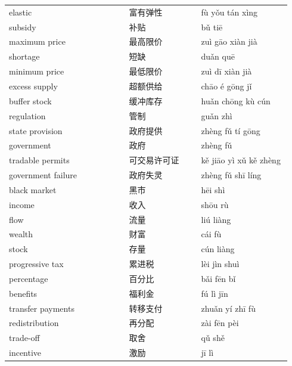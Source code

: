\documentclass[11pt]{article}
\begin{document}
\begin{longtable}{@{}p{0.40\linewidth}p{0.24\linewidth}p{0.30\linewidth}@{}}
elastic & 富有弹性 & fù yǒu tán xìng \\
subsidy & 补贴 & bǔ tiē \\
maximum price & 最高限价 & zuì gāo xiàn jià \\
shortage & 短缺 & duǎn quē \\
minimum price & 最低限价 & zuì dī xiàn jià \\
excess supply & 超额供给 & chāo é gōng jǐ \\
buffer stock & 缓冲库存 & huǎn chōng kù cún \\
regulation & 管制 & guǎn zhì \\
state provision & 政府提供 & zhèng fǔ tí gōng \\
government & 政府 & zhèng fǔ \\
tradable permits & 可交易许可证 & kě jiāo yì xǔ kě zhèng \\
government failure & 政府失灵 & zhèng fǔ shī líng \\
black market & 黑市 & hēi shì \\
income & 收入 & shōu rù \\
flow & 流量 & liú liàng \\
wealth & 财富 & cái fù \\
stock & 存量 & cún liàng \\
progressive tax & 累进税 & lèi jìn shuì \\
percentage & 百分比 & bǎi fēn bǐ \\
benefits & 福利金 & fú lì jīn \\
transfer payments & 转移支付 & zhuǎn yí zhī fù \\
redistribution & 再分配 & zài fēn pèi \\
trade-off & 取舍 & qǔ shě \\
incentive & 激励 & jī lì \\
\end{longtable}
\end{document}
